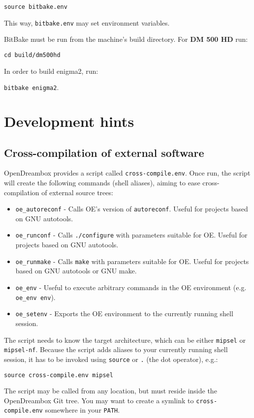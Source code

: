 \documentclass[a4paper]{article}
\newcommand{\shell}[1]{\texttt{\small #1}}
\begin{document}
     \shell{source bitbake.env}

     This way, \shell{bitbake.env} may set environment variables.

     BitBake must be run from the machine's build directory. For \textbf{DM 500 HD} run:

     \shell{cd build/dm500hd}

     In order to build enigma2, run:

     \shell{bitbake enigma2}.

\section{Development hints}

  \subsection{Cross-compilation of external software}
    OpenDreambox provides a script called \shell{cross-compile.env}. Once run, the script will create
    the following commands (shell aliases), aiming to ease cross-compilation of external source trees:

    \begin{itemize}
      \item \shell{oe\_autoreconf} - Calls OE's version of \shell{autoreconf}. Useful for projects based on GNU autotools.
      \item \shell{oe\_runconf} - Calls \shell{./configure} with parameters suitable for OE. Useful for projects based on GNU autotools.
      \item \shell{oe\_runmake} - Calls \shell{make} with parameters suitable for OE. Useful for projects based on GNU autotools or GNU make.
      \item \shell{oe\_env} - Useful to execute arbitrary commands in the OE environment (e.g. \shell{oe\_env env}).
      \item \shell{oe\_setenv} - Exports the OE environment to the currently running shell session.
    \end{itemize}

    The script needs to know the target architecture, which can be either \shell{mipsel} or \shell{mipsel-nf}. Because the script
    adds aliases to your currently running shell session, it has to be invoked using \shell{source} or \shell{.} (the dot operator), e.g.:

    \shell{source cross-compile.env mipsel}

    The script may be called from any location, but must reside inside the OpenDreambox Git tree.
    You may want to create a symlink to \shell{cross-compile.env} somewhere in your \shell{PATH}.
\end{document}
